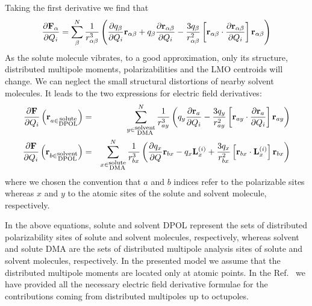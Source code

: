 \documentclass[b5paper,oneside,fleqn,11pt]{book}
\newcommand{\fderiv}[2]{\ensuremath{
    \frac{\partial #1}{\partial #2}}}
\begin{document}
\begin{refsection}
%
Taking the first derivative we find that
%
\begin{equation}
\fderiv{{\bf F}_\alpha}{Q_i} = \sum_\beta^N \frac{1}{r_{\alpha\beta}^3}  
        \left(
            \fderiv{q_\beta}{Q_i}{\bf r}_{\alpha\beta} + q_\beta \fderiv{{\bf r}_{\alpha\beta}}{Q_i} - \frac{3q_\beta}{r_{\alpha\beta}^2} 
                \left[ 
                     {\bf r}_{\alpha\beta} \cdot \fderiv{{\bf r}_{\alpha\beta}}{Q_i} 
                \right] {\bf r}_{\alpha\beta}
        \right)
\end{equation}
%
As the solute molecule vibrates, to a good approximation, 
only its structure, distributed multipole moments, polarizabilities 
and the LMO centroids will change. We can neglect the small 
structural distortions of nearby solvent molecules. 
It leads to the two expressions for electric field derivatives:
%
\begin{eqnarray}
\fderiv{{\bf F}}{Q_i} \left({\bf r}_{a\in\substack{\text{solute}\\\text{DPOL}}} \right)
   &=& \sum_{y\in\substack{\text{solvent}\\\text{DMA}}}^N \frac{1}{r_{ay}^3}  
        \left(
                q_y \fderiv{{\bf r}_{a}}{Q_i} - \frac{3q_y}{r_{ay}^2} 
                \left[ 
                     {\bf r}_{ay} \cdot \fderiv{{\bf r}_{a}}{Q_i} 
                \right] {\bf r}_{ay}
        \right) \\
%
\fderiv{{\bf F}}{Q_i} \left({\bf r}_{b\in\substack{\text{solvent}\\\text{DPOL}}} \right)
    &=& \sum_{x\in\substack{\text{solute}\\\text{DMA}}}^N \frac{1}{r_{bx}^3}  
        \left(
            \fderiv{q_x}{Q}{\bf r}_{bx} - q_x {\bf L}_x^{(i)} + \frac{3q_x}{r_{bx}^2} 
                \left[ 
                     {\bf r}_{bx} \cdot {\bf L}_x^{(i)}
                \right] {\bf r}_{bx}
        \right)
\end{eqnarray}
%
where we chosen the convention that $a$ and $b$ indices refer to the 
polarizable sites whereas $x$ and $y$ to the atomic sites of the solute
and solvent molecule, respectively.

In the above equations, solute and solvent DPOL represent the sets 
of distributed polarizability sites of solute and solvent molecules, 
respectively, whereas solvent and solute DMA are the sets of distributed 
multipole analysis sites of solute and solvent molecules, respectively. 
In the presented model we assume that the distributed multipole moments are located only at atomic points.
In the Ref.~\citep{Blasiak.Cho.JCP.2014} we have provided all the 
necessary electric field derivative formulae for the contributions
coming from distributed multipoles up to octupoles. 


\end{refsection}
\end{document}
